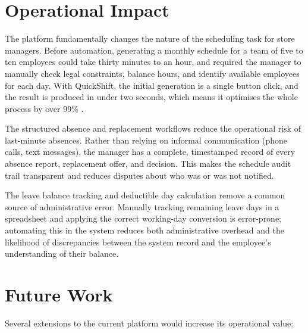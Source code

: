 \section{Operational Impact}
\par The platform fundamentally changes the nature of the scheduling task for store managers. Before automation, generating a monthly schedule for a team of five to ten employees could take thirty minutes to an hour, and required the manager to manually check legal constraints, balance hours, and identify available employees for each day. With QuickShift, the initial generation is a single button click, and the result is produced in under two seconds, which means it optimises the whole process by over 99\% .

\par The structured absence and replacement workflows reduce the operational risk of last-minute absences. Rather than relying on informal communication (phone calls, text messages), the manager has a complete, timestamped record of every absence report, replacement offer, and decision. This makes the schedule audit trail transparent and reduces disputes about who was or was not notified.

\par The leave balance tracking and deductible day calculation remove a common source of administrative error. Manually tracking remaining leave days in a spreadsheet and applying the correct working-day conversion is error-prone; automating this in the system reduces both administrative overhead and the likelihood of discrepancies between the system record and the employee's understanding of their balance.

\section{Future Work}
\par Several extensions to the current platform would increase its operational value:

